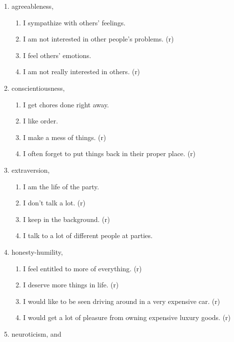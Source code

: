 \documentclass[
  singlecolumn]{article}
\providecommand{\tightlist}{%
  \setlength{\itemsep}{0pt}\setlength{\parskip}{0pt}}\usepackage{longtable,booktabs,array}
\begin{document}
\begin{enumerate}
\def\labelenumi{\arabic{enumi}.}
\item
  agreeableness,

  \begin{enumerate}
  \def\labelenumii{\roman{enumii}.}
  \tightlist
  \item
    I sympathize with others' feelings.
  \item
    I am not interested in other people's problems. (r)
  \item
    I feel others' emotions.
  \item
    I am not really interested in others. (r)
  \end{enumerate}
\item
  conscientiousness,

  \begin{enumerate}
  \def\labelenumii{\roman{enumii}.}
  \tightlist
  \item
    I get chores done right away.
  \item
    I like order.
  \item
    I make a mess of things. (r)
  \item
    I often forget to put things back in their proper place. (r)
  \end{enumerate}
\item
  extraversion,

  \begin{enumerate}
  \def\labelenumii{\roman{enumii}.}
  \tightlist
  \item
    I am the life of the party.
  \item
    I don't talk a lot. (r)
  \item
    I keep in the background. (r)
  \item
    I talk to a lot of different people at parties.
  \end{enumerate}
\item
  honesty-humility,

  \begin{enumerate}
  \def\labelenumii{\roman{enumii}.}
  \tightlist
  \item
    I feel entitled to more of everything. (r)
  \item
    I deserve more things in life. (r)
  \item
    I would like to be seen driving around in a very expensive car. (r)
  \item
    I would get a lot of pleasure from owning expensive luxury goods.
    (r)
  \end{enumerate}
\item
  neuroticism, and


\end{enumerate}
\end{document}
